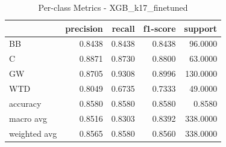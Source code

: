 \begin{table}
\caption{Per-class Metrics - XGB_k17_finetuned}
\begin{tabular}{lrrrr}
\toprule
 & precision & recall & f1-score & support \\
\midrule
BB & 0.8438 & 0.8438 & 0.8438 & 96.0000 \\
C & 0.8871 & 0.8730 & 0.8800 & 63.0000 \\
GW & 0.8705 & 0.9308 & 0.8996 & 130.0000 \\
WTD & 0.8049 & 0.6735 & 0.7333 & 49.0000 \\
accuracy & 0.8580 & 0.8580 & 0.8580 & 0.8580 \\
macro avg & 0.8516 & 0.8303 & 0.8392 & 338.0000 \\
weighted avg & 0.8565 & 0.8580 & 0.8560 & 338.0000 \\
\bottomrule
\end{tabular}
\end{table}
